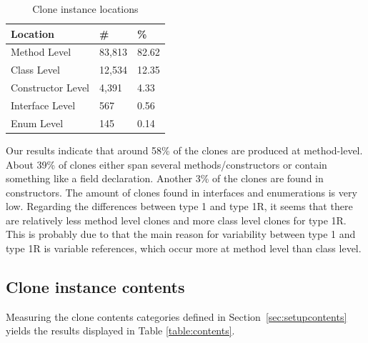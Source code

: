 \begin{table}[H]
  \begin{center}
  \caption{Clone instance locations} \label{table:locations}
  \medskip
\begin{tabular}{|l|l|l|}
\hline
\textbf{Location}   & \textbf{\#} & \textbf{\%} \\ \hline
Method Level        & 83,813 & 82.62            \\ \hline
Class Level        & 12,534 & 12.35            \\ \hline
Constructor Level    & 4,391 & 4.33           \\ \hline
Interface Level   & 567 & 0.56           \\ \hline
Enum Level         & 145 & 0.14            \\ \hline
\end{tabular}
\end{center}
\end{table}

Our results indicate that around 58\% of the clones are produced at method-level. About 39\% of clones either span several methods/constructors or contain something like a field declaration. Another 3\% of the clones are found in constructors. The amount of clones found in interfaces and enumerations is very low. Regarding the differences between type 1 and type 1R, it seems that there are relatively less method level clones and more class level clones for type 1R. This is probably due to that the main reason for variability between type 1 and type 1R is variable references, which occur more at method level than class level.

\subsection{Clone instance contents}\label{chap:clonecontents}
Measuring the clone contents categories defined in Section~\ref{sec:setupcontents} yields the results displayed in Table \ref{table:contents}.

